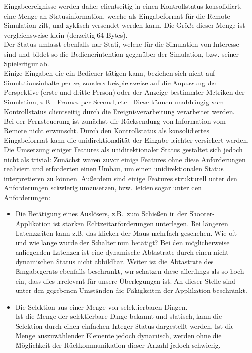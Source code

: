 Eingabeereignisse werden daher clientseitig in einen Kontrollstatus konsolidiert, eine Menge an Statusinformation, welche als Eingabeformat für die Remote-Simulation gilt, und zyklisch versendet werden kann. Die Größe dieser Menge ist vergleichsweise klein (derzeitig 64 Bytes).\\
Der Status umfasst ebenfalls nur Stati, welche für die Simulation von Interesse sind und bildet so die Bedienerintention gegenüber der Simulation, bzw. seiner Spielerfigur ab.\\
Einige Eingaben die ein Bediener tätigen kann, beziehen sich nicht auf Simulationsinhalte per se, sonders beispielsweise auf die Anpassung der Perspektive (erste und dritte Person) oder der Anzeige bestimmter Metriken der Simulation, z.B.~ Frames per Second, etc.. Diese können unabhängig vom Kontrollstatus clientseitig durch die Ereignisverarbeitung verarbeitet werden.\\


Bei der Fernsteuerung ist zunächst die Rücksendung von Information vom Remote nicht erwünscht. Durch den Kontrollstatus als konsolidiertes Eingabeformat kann die unidirektionalität der Eingabe leichter versichert werden.
Die Umsetzung einiger Features als unidirektionaler Status gestaltet sich jedoch nicht als trivial:
Zunächst waren zuvor einige Features ohne diese Anforderungen realisiert und erforderten einen Umbau, um einen unidirektionalen Status interpretieren zu können.
Außerdem sind einige Features strukturell unter den Anforderungen schwierig umzusetzen, bzw.~leiden sogar unter den Anforderungen:
\begin{itemize}
\item Die Betätigung eines Auslösers, z.B.~zum Schießen in der Shooter-Applikation ist starken Echtzeitanforderungen unterlegen. Bei längeren Latenzzeiten kann z.B. das klicken der Maus mehrfach geschehen. Wie oft und wie lange wurde der Schalter nun betätigt? Bei den möglicherweise anliegenden Latenzen ist eine dynamische Abtastrate durch einen nicht-dynamischen Status nicht abbildbar. Weiter ist die Abtastrate des Eingabegeräts ebenfalls beschränkt, wir schätzen diese allerdings als so hoch ein, dass dies irrelevant für unsere Überlegungen ist. An dieser Stelle sind unter den gegebenen Umständen die Fähigkeiten der Applikation beschränkt.
\item Die Selektion aus einer Menge von selektierbaren Dingen.\\
Ist die Menge der selektierbare Dinge bekannt und statisch, kann die Selektion durch einen einfachen Integer-Status dargestellt werden. Ist die Menge auszuwählender Elemente jedoch dynamisch, werden ohne die Möglichkeit der Rückkommunikation dieser Anzahl jedoch schwierig.
\end{itemize}

